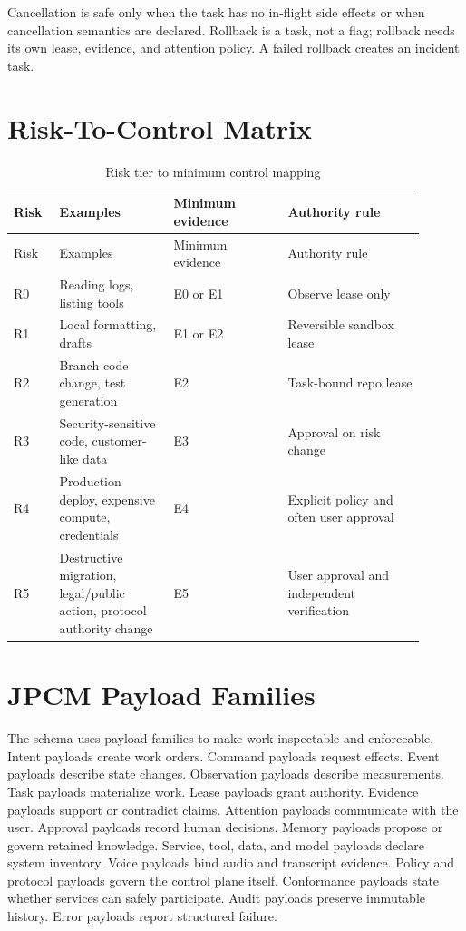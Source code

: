 \documentclass[10pt,journal,onecolumn]{IEEEtran}
\begin{document}
Cancellation is safe only when the task has no in-flight side effects or when cancellation semantics are declared. Rollback is a task, not a flag; rollback needs its own lease, evidence, and attention policy. A failed rollback creates an incident task.

\section{Risk-To-Control Matrix}
\begin{longtable}{p{0.10\linewidth}p{0.25\linewidth}p{0.25\linewidth}p{0.30\linewidth}}
\caption{Risk tier to minimum control mapping}\label{tab:riskcontrols}\\
\toprule
Risk & Examples & Minimum evidence & Authority rule\\
\midrule
\endfirsthead
\toprule
Risk & Examples & Minimum evidence & Authority rule\\
\midrule
\endhead
R0 & Reading logs, listing tools & E0 or E1 & Observe lease only\\
R1 & Local formatting, drafts & E1 or E2 & Reversible sandbox lease\\
R2 & Branch code change, test generation & E2 & Task-bound repo lease\\
R3 & Security-sensitive code, customer-like data & E3 & Approval on risk change\\
R4 & Production deploy, expensive compute, credentials & E4 & Explicit policy and often user approval\\
R5 & Destructive migration, legal/public action, protocol authority change & E5 & User approval and independent verification\\
\bottomrule
\end{longtable}

\section{JPCM Payload Families}
The schema uses payload families to make work inspectable and enforceable. Intent payloads create work orders. Command payloads request effects. Event payloads describe state changes. Observation payloads describe measurements. Task payloads materialize work. Lease payloads grant authority. Evidence payloads support or contradict claims. Attention payloads communicate with the user. Approval payloads record human decisions. Memory payloads propose or govern retained knowledge. Service, tool, data, and model payloads declare system inventory. Voice payloads bind audio and transcript evidence. Policy and protocol payloads govern the control plane itself. Conformance payloads state whether services can safely participate. Audit payloads preserve immutable history. Error payloads report structured failure.
\end{document}
